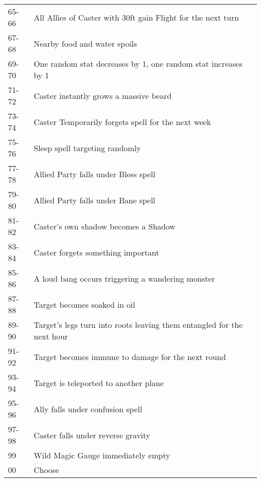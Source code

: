 \documentclass[18pt]{article}
\begin{document}
\begin{table}[H]
\begin{center}
\begin{tabularx}{\textwidth}{s 
>{\arraybackslash{}\hsize}X}
65-66 & All Allies of Caster with 30ft gain Flight for the next turn \\
67-68 & Nearby food and water spoils\\
69-70 & One random stat decreases by 1, one random stat increases by 1\\
71-72 & Caster instantly grows a massive beard\\
73-74 & Caster Temporarily forgets spell for the next week\\
75-76 & Sleep spell targeting randomly\\
77-78 & Allied Party falls under Bless spell\\
79-80 & Allied Party falls under Bane spell\\
81-82 & Caster's own shadow becomes a Shadow \\
83-84 & Caster forgets something important\\
85-86 & A loud bang occurs triggering a wandering monster \\
87-88 & Target becomes soaked in oil\\
89-90 & Target's legs turn into roots leaving them entangled for the next hour\\
91-92 & Target becomes immune to damage for the next round\\
93-94 & Target is teleported to another plane\\
95-96 & Ally falls under confusion spell\\
97-98 & Caster falls under reverse gravity\\
99 & Wild Magic Gauge immediately empty \\
00 & Choose \\
\end{tabularx}
\end{center}
\label{table:WildMagic}
\end{table}
\end{document}
